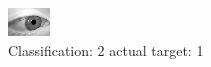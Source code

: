 \begin{figure}[h!]
\begin{center}
\includegraphics[width=0.60\columnwidth]{figures/ID2770_class_2_target_1.png}
\end{center}
\caption{ Classification: 2 actual target: 1}
\label{fig:ID2770_class_2_target_1}
\end{figure}
